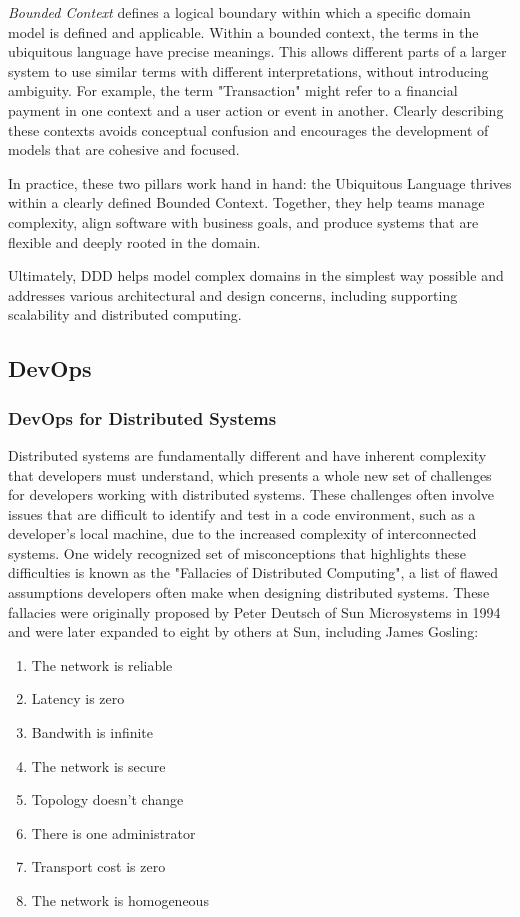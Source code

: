 \emph{Bounded Context} defines a logical boundary within which a specific domain model is defined and applicable. Within a bounded context, the terms in the ubiquitous language have precise meanings. This allows different parts of a larger system to use similar terms with different interpretations, without introducing ambiguity. For example, the term "Transaction" might refer to a financial payment in one context and a user action or event in another. Clearly describing these contexts avoids conceptual confusion and encourages the development of models that are cohesive and focused.

In practice, these two pillars work hand in hand: the Ubiquitous Language thrives within a clearly defined Bounded Context. Together, they help teams manage complexity, align software with business goals, and produce systems that are flexible and deeply rooted in the domain.

Ultimately, DDD helps model complex domains in the simplest way possible and addresses various architectural and design concerns, including supporting scalability and distributed computing.

\subsection{DevOps}
\label{devops}
\subsubsection{DevOps for Distributed Systems}
\label{devops_distributed}
Distributed systems are fundamentally different and have inherent complexity that developers must understand, which presents a whole new set of challenges for developers working with distributed systems. These challenges often involve issues that are difficult to identify and test in a code environment, such as a developer’s local machine, due to the increased complexity of interconnected systems. One widely recognized set of misconceptions that highlights these difficulties is known as the "Fallacies of Distributed Computing", a list of flawed assumptions developers often make when designing distributed systems. These fallacies were originally proposed by Peter Deutsch of Sun Microsystems in 1994 and were later expanded to eight by others at Sun, including James Gosling:
\begin{enumerate}
    \item The network is reliable
    \item Latency is zero
    \item Bandwith is infinite
    \item The network is secure
    \item Topology doesn't change
    \item There is one administrator
    \item Transport cost is zero
    \item The network is homogeneous
\end{enumerate}

